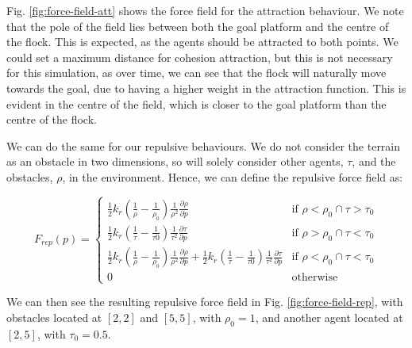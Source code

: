 \documentclass[12pt]{article}
\begin{document}
Fig. \ref{fig:force-field-att} shows the force field for the attraction behaviour. We note that the pole of the field lies between both the goal platform and the centre of the flock. This is expected, as the agents should be attracted to both points. We could set a maximum distance for cohesion attraction, but this is not necessary for this simulation, as over time, we can see that the flock will naturally move towards the goal, due to having a higher weight in the attraction function. This is evident in the centre of the field, which is closer to the goal platform than the centre of the flock.

We can do the same for our repulsive behaviours. We do not consider the terrain as an obstacle in two dimensions, so will solely consider other agents, $\tau$, and the obstacles, $\rho$, in the environment. Hence, we can define the repulsive force field as:


\begin{equation}
    F_{rep}(p) = 
    \begin{cases}
        \frac{1}{2}k_r(\frac{1}{\rho}-\frac{1}{\rho_{0}})\frac{1}{\rho^2}\frac{\partial \rho}{\partial p} & \text{if } \rho < \rho_{0} \cap \tau > \tau_{0} \\
        \frac{1}{2}k_r(\frac{1}{\tau}-\frac{1}{\tau{0}})\frac{1}{\tau^2}\frac{\partial \tau}{\partial p} & \text{if } \rho > \rho_{0} \cap \tau < \tau_{0} \\
        \frac{1}{2}k_r(\frac{1}{\rho}-\frac{1}{\rho_{0}})\frac{1}{\rho^2}\frac{\partial \rho}{\partial p} + \frac{1}{2}k_r(\frac{1}{\tau}-\frac{1}{\tau{0}})\frac{1}{\tau^2}\frac{\partial \tau}{\partial p} & \text{if } \rho < \rho_{0} \cap \tau < \tau_{0} \\
        0 & \text{otherwise}
    \end{cases}
\end{equation}

We can then see the resulting repulsive force field in Fig. \ref{fig:force-field-rep}, with obstacles located at $[2,2]$ and $[5,5]$, with $\rho_0 = 1$, and another agent located at $[2,5]$, with $\tau_0 = 0.5$.
\end{document}

